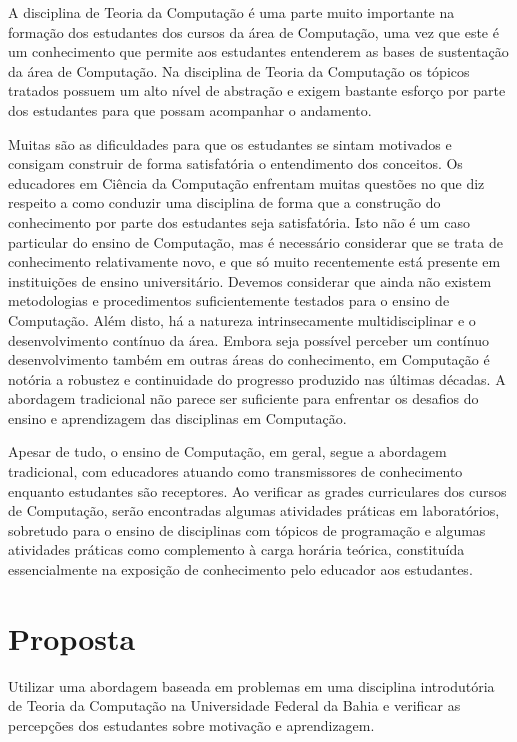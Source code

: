 \newcommand{\publicacaoTemplate}[2]{%
\textbf{#1} : #2}


\acresetall
\label{cap-introducao}
A disciplina de Teoria da Computação é uma parte muito importante
na formação dos estudantes dos cursos da área de Computação, uma 
vez que este é um conhecimento que permite aos estudantes
entenderem as bases de sustentação da área de Computação.
Na disciplina de Teoria da Computação os tópicos tratados
possuem um alto nível de abstração e exigem bastante esforço
por parte dos estudantes para que possam acompanhar o
andamento.

Muitas são as dificuldades para que os estudantes se sintam
motivados e consigam construir de forma satisfatória o entendimento
dos conceitos.
Os educadores em Ciência da Computação enfrentam muitas questões no que diz
respeito a como conduzir uma disciplina de forma que a construção do conhecimento
por parte dos estudantes seja satisfatória.
Isto não é um caso particular do ensino de Computação,
mas é necessário considerar que se trata de
conhecimento relativamente novo, e que só muito
recentemente está presente em instituições de ensino universitário.
Devemos considerar que ainda não existem metodologias e procedimentos
suficientemente testados para o ensino de Computação.
Além disto, há a natureza intrinsecamente multidisciplinar e
o desenvolvimento contínuo da área.
Embora seja possível perceber um contínuo desenvolvimento também em
outras áreas do conhecimento, em Computação é notória a robustez e
continuidade do progresso produzido nas últimas décadas.
A abordagem tradicional não parece ser suficiente para enfrentar
os desafios do ensino e aprendizagem das disciplinas
em Computação.

Apesar de tudo, o ensino de Computação, em geral, segue a abordagem
tradicional, com educadores atuando como transmissores de conhecimento
enquanto estudantes são receptores.
Ao verificar as grades curriculares dos cursos de Computação,
serão encontradas algumas atividades práticas em laboratórios,
sobretudo para o ensino de disciplinas com tópicos de programação e
algumas atividades práticas como complemento à carga horária teórica,
constituída essencialmente na exposição de conhecimento pelo educador
aos estudantes.

\section{Proposta}
\label{sec-proposta}
Utilizar uma abordagem baseada em problemas em uma disciplina
introdutória de Teoria da Computação na Universidade Federal
da Bahia e verificar as percepções dos estudantes sobre
motivação e aprendizagem.

